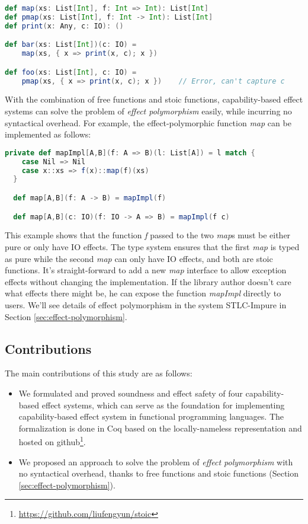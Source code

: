 \begin{lstlisting}[language=Scala]
def map(xs: List[Int], f: Int => Int): List[Int]
def pmap(xs: List[Int], f: Int -> Int): List[Int]
def print(x: Any, c: IO): ()

def bar(xs: List[Int])(c: IO) =
    map(xs, { x => print(x, c); x })

def foo(xs: List[Int], c: IO) =
    pmap(xs, { x => print(x, c); x })    // Error, can't capture c
\end{lstlisting}

With the combination of free functions and stoic functions,
capability-based effect systems can solve the problem of \emph{effect
  polymorphism} easily, while incurring no syntactical overhead. For
example, the effect-polymorphic function \emph{map} can be implemented
as follows:

\begin{lstlisting}[language=Scala]
  private def mapImpl[A,B](f: A => B)(l: List[A]) = l match {
    case Nil => Nil
    case x::xs => f(x)::map(f)(xs)
  }

  def map[A,B](f: A -> B) = mapImpl(f)

  def map[A,B](c: IO)(f: IO -> A => B) = mapImpl(f c)
\end{lstlisting}

This example shows that the function \emph{f} passed to the two
\emph{map}s must be either pure or only have IO effects. The type
system ensures that the first \emph{map} is typed as pure while the
second \emph{map} can only have IO effects, and both are stoic
functions. It's straight-forward to add a new \emph{map} interface to
allow exception effects without changing the implementation. If the
library author doesn't care what effects there might be, he can expose
the function \emph{mapImpl} directly to users.  We'll see details of
effect polymorphism in the system STLC-Impure in Section
\ref{sec:effect-polymorphism}.

\subsection{Contributions}

The main contributions of this study are as follows:

\begin{itemize}
\item We formulated and proved soundness and effect safety of four
  capability-based effect systems, which can serve as the foundation
  for implementing capability-based effect system in functional
  programming languages. The formalization is done in Coq based on the
  locally-nameless representation\cite{chargueraud-11-ln} and hosted
  on github\footnote{\url{https://github.com/liufengyun/stoic}}.
\item We proposed an approach to solve the problem of \emph{effect
    polymorphism} with no syntactical overhead, thanks to free
  functions and stoic functions (Section
  \ref{sec:effect-polymorphism}).
\end{itemize}

